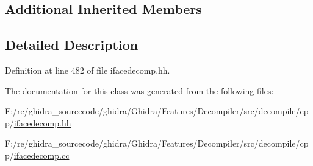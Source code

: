 \subsection*{Additional Inherited Members}


\subsection{Detailed Description}


Definition at line 482 of file ifacedecomp.\+hh.



The documentation for this class was generated from the following files\+:\begin{DoxyCompactItemize}
\item 
F\+:/re/ghidra\+\_\+sourcecode/ghidra/\+Ghidra/\+Features/\+Decompiler/src/decompile/cpp/\mbox{\hyperlink{ifacedecomp_8hh}{ifacedecomp.\+hh}}\item 
F\+:/re/ghidra\+\_\+sourcecode/ghidra/\+Ghidra/\+Features/\+Decompiler/src/decompile/cpp/\mbox{\hyperlink{ifacedecomp_8cc}{ifacedecomp.\+cc}}\end{DoxyCompactItemize}

